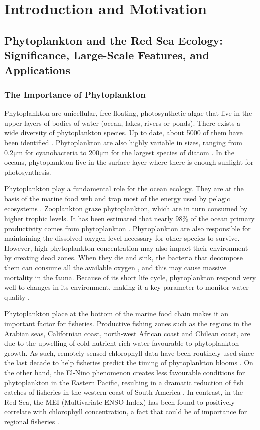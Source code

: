 \chapter{Introduction and Motivation}

\section{Phytoplankton and the Red Sea Ecology: Significance, Large-Scale
Features, and Applications}

\subsection{The Importance of Phytoplankton}

Phytoplankton are unicellular, free-floating, photosynthetic algae that live in
the upper layers of bodies of water (ocean, lakes, rivers or ponds). There
exists a wide diversity of phytoplankton species. Up to date, about 5000 of
them have been identified \citep{Tett1995}. Phytoplankton are also highly
variable in sizes, ranging from 0.2μm for cyanobacteria to 200μm for the
largest species of diatom \citep{Pal2014}. In the oceans, phytoplankton live in
the surface layer where there is enough sunlight for photosynthesis. 

Phytoplankton play a fundamental role for the ocean ecology. They are at the
basis of the marine food web and trap most of the energy used by pelagic
ecosystems \citep{Pal2014}. Zooplankton graze phytoplankton, which are in turn
consumed by higher trophic levels. It has been estimated that nearly 98\% of
the ocean primary productivity comes from phytoplankton \citep{Pal2014}.
Phytoplankton are also responsible for maintaining the dissolved oxygen level
necessary for other species to survive. However, high phytoplankton
concentration may also impact their environment by creating dead zones. When
they die and sink, the bacteria that decompose them can consume all the
available oxygen \citep{Pal2014}, and this may cause massive mortality in the
fauna. Because of its short life cycle, phytoplankton respond very well to
changes in its environment, making it a key parameter to monitor water quality
\citep{Wu2014}.

Phytoplankton place at the bottom of the marine food chain makes it an
important factor for fisheries. Productive fishing zones such as the regions in
the Arabian seas, Californian coast, north-west African coast and Chilean
coast, are due to the upwelling of cold nutrient rich water favourable to
phytoplankton growth. As such, remotely-sensed chlorophyll data have been
routinely used since the last decade to help fisheries predict the timing of
phytoplankton blooms \citep{Robinson2010}. On the other hand, the El-Nino
phenomenon creates less favourable conditions for phytoplankton in the Eastern
Pacific, resulting in a dramatic reduction of fish catches of fisheries in the
western coast of South America \citep{Robinson2010}. In contrast, in the Red
Sea, the MEI (Multivariate ENSO Index) has been found to positively correlate
with chlorophyll concentration, a fact that could be of importance for regional
fisheries \citep{Raitsos2015}.

